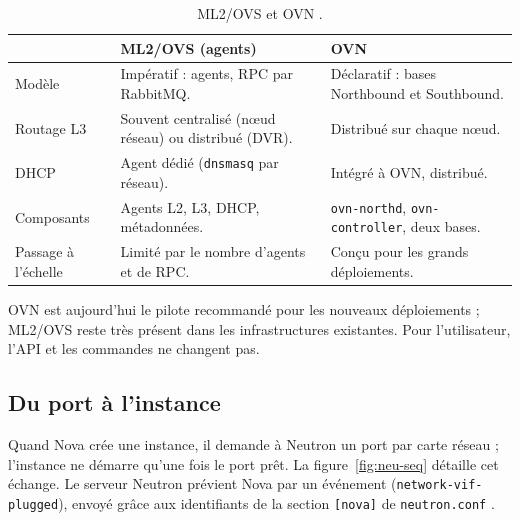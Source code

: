 \begin{table}[!ht]
\centering
\renewcommand{\arraystretch}{1.3}
\begin{tabular}{@{}>{\raggedright\arraybackslash}p{2.8cm}>{\raggedright\arraybackslash}p{6.2cm}>{\raggedright\arraybackslash}p{6.5cm}@{}}
\toprule
 & \textbf{ML2/OVS (agents)} & \textbf{OVN} \\
\midrule
Modèle & Impératif : agents, RPC par RabbitMQ. & Déclaratif : bases Northbound et Southbound. \\
Routage L3 & Souvent centralisé (nœud réseau) ou distribué (DVR). & Distribué sur chaque nœud. \\
DHCP & Agent dédié (\texttt{dnsmasq} par réseau). & Intégré à OVN, distribué. \\
Composants & Agents L2, L3, DHCP, métadonnées. & \texttt{ovn-northd}, \texttt{ovn-controller}, deux bases. \\
Passage à l'échelle & Limité par le nombre d'agents et de RPC. & Conçu pour les grands déploiements. \\
\bottomrule
\end{tabular}
\caption{ML2/OVS et OVN \parencite{neutron-ovn-faq}.}
\label{tab:neu-ovn}
\end{table}

OVN est aujourd'hui le pilote recommandé pour les nouveaux déploiements ; ML2/OVS reste très présent dans les
infrastructures existantes. Pour l'utilisateur, l'API et les commandes ne changent pas.

\subsection{Du port à l'instance}\label{sec:neu-port}

Quand Nova crée une instance, il demande à Neutron un port par carte réseau ; l'instance ne démarre qu'une fois le
port prêt. La figure~\ref{fig:neu-seq} détaille cet échange. Le serveur Neutron prévient Nova par un événement
(\texttt{network-vif-plugged}), envoyé grâce aux identifiants de la section \texttt{[nova]} de \texttt{neutron.conf}
\parencite{neutron-install-controller}.

